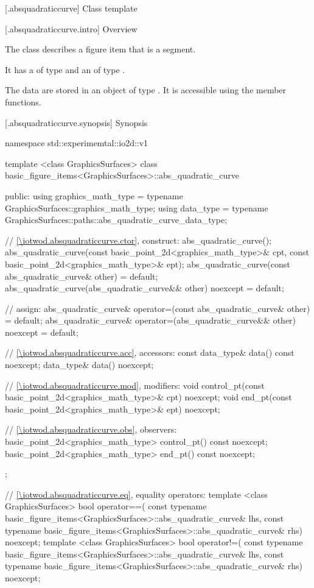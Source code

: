  [\iotwod.absquadraticcurve] {Class template }

 [\iotwod.absquadraticcurve.intro] {Overview}

\pnum
{}%
The class  describes a figure item that is a segment.

\pnum
It has a  of type  and an  of type .

\pnum
The data are stored in an object of type . It is accessible using the  member functions.

 [\iotwod.absquadraticcurve.synopsis] {Synopsis}
\begin{codeblock}
namespace std::experimemtal::io2d::v1 {
  template <class GraphicsSurfaces>
  class basic_figure_items<GraphicsSurfaces>::abs_quadratic_curve {
  public:
    using graphics_math_type = typename GraphicsSurfaces::graphics_math_type;
    using data_type =
      typename GraphicsSurfaces::paths::abs_quadratic_curve_data_type;

    // \ref{\iotwod.absquadraticcurve.ctor}, construct:
    abs_quadratic_curve();
    abs_quadratic_curve(const basic_point_2d<graphics_math_type>& cpt,
      const basic_point_2d<graphics_math_type>& ept);
    abs_quadratic_curve(const abs_quadratic_curve& other) = default;
    abs_quadratic_curve(abs_quadratic_curve&& other) noexcept = default;

    // assign:
    abs_quadratic_curve& operator=(const abs_quadratic_curve& other) = default;
    abs_quadratic_curve& operator=(abs_quadratic_curve&& other) noexcept = default;

    // \ref{\iotwod.absquadraticcurve.acc}, accessors:
    const data_type& data() const noexcept;
    data_type& data() noexcept;

    // \ref{\iotwod.absquadraticcurve.mod}, modifiers:
    void control_pt(const basic_point_2d<graphics_math_type>& cpt) noexcept;
    void end_pt(const basic_point_2d<graphics_math_type>& ept) noexcept;

    // \ref{\iotwod.absquadraticcurve.obs}, observers:
    basic_point_2d<graphics_math_type> control_pt() const noexcept;
    basic_point_2d<graphics_math_type> end_pt() const noexcept;
  };

  // \ref{\iotwod.absquadraticcurve.eq}, equality operators:
  template <class GraphicsSurfaces>
  bool operator==(
    const typename basic_figure_items<GraphicsSurfaces>::abs_quadratic_curve& lhs,
    const typename basic_figure_items<GraphicsSurfaces>::abs_quadratic_curve& rhs) 
    noexcept;  
  template <class GraphicsSurfaces>
  bool operator!=(
    const typename basic_figure_items<GraphicsSurfaces>::abs_quadratic_curve& lhs,
    const typename basic_figure_items<GraphicsSurfaces>::abs_quadratic_curve& rhs) 
    noexcept;  
}
\end{codeblock}

